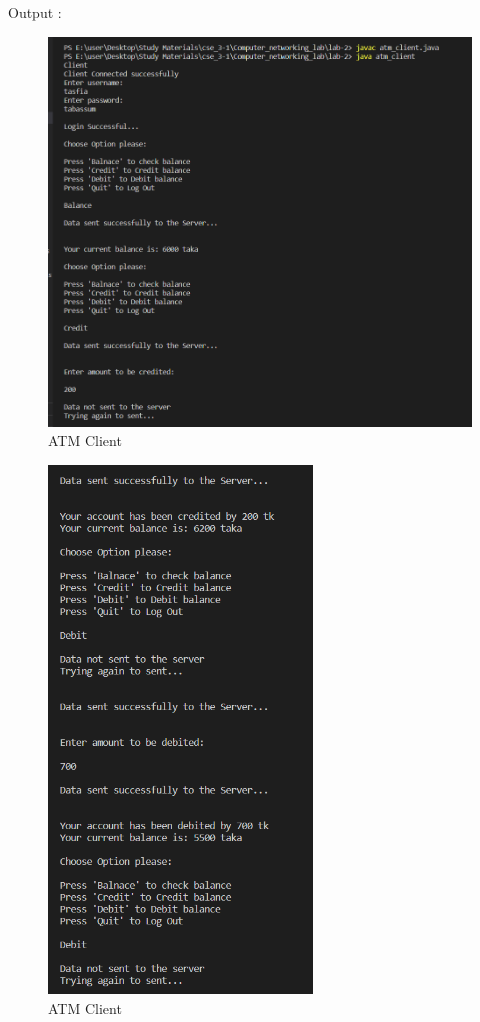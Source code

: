 \documentclass[11pt]{article}
\begin{document}
 Output : 
\begin{figure}[!h]
\centering
\includegraphics[width=\textwidth]{atm_client1.png}
\caption{ATM Client}
\end{figure}
\begin{figure}[!h]
\centering
\includegraphics[width=\textwidth,height=14cm,keepaspectratio]{atm_client2.png}
\caption{ATM Client}
\end{figure}
\end{document}
